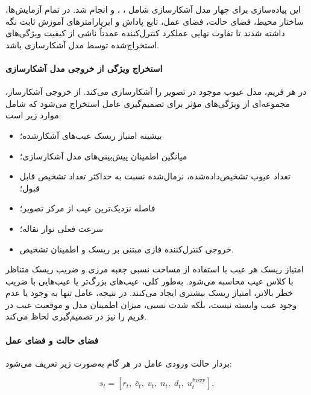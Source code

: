 \documentclass[a4paper, 10pt, twocolumn]{article}
\begin{document}
	این پیاده‌سازی برای چهار مدل آشکارسازی شامل ، ،  و  انجام شد. در تمام آزمایش‌ها، ساختار محیط، فضای حالت، فضای عمل، تابع پاداش و ابرپارامترهای آموزش  ثابت نگه داشته شدند تا تفاوت نهایی عملکرد کنترل‌کننده عمدتاً ناشی از کیفیت ویژگی‌های استخراج‌شده توسط مدل آشکارسازی باشد.
	
	\paragraph{استخراج ویژگی از خروجی مدل آشکارسازی}
	
	در هر فریم، مدل  عیوب موجود در تصویر را آشکارسازی می‌کند. از خروجی آشکارساز، مجموعه‌ای از ویژگی‌های مؤثر برای تصمیم‌گیری عامل استخراج می‌شود که شامل موارد زیر است:
	
	\begin{itemize}
		\item بیشینه امتیاز ریسک عیب‌های آشکارشده؛
		\item میانگین اطمینان پیش‌بینی‌های مدل آشکارسازی؛
		\item تعداد عیوب تشخیص‌داده‌شده، نرمال‌شده نسبت به حداکثر تعداد تشخیص قابل قبول؛
		\item فاصله نزدیک‌ترین عیب از مرکز تصویر؛
		\item سرعت فعلی نوار نقاله؛
		\item خروجی کنترل‌کننده فازی مبتنی بر ریسک و اطمینان تشخیص.
	\end{itemize}
	
	امتیاز ریسک هر عیب با استفاده از مساحت نسبی جعبه مرزی و ضریب ریسک متناظر با کلاس عیب محاسبه می‌شود. به‌طور کلی، عیب‌های بزرگ‌تر یا عیب‌هایی با ضریب خطر بالاتر، امتیاز ریسک بیشتری ایجاد می‌کنند. در نتیجه، عامل  تنها به وجود یا عدم وجود عیب وابسته نیست، بلکه شدت نسبی، میزان اطمینان مدل و موقعیت عیب در فریم را نیز در تصمیم‌گیری لحاظ می‌کند.
	
	\paragraph{فضای حالت و فضای عمل}
	
	بردار حالت ورودی عامل در هر گام به‌صورت زیر تعریف می‌شود:
	
	\begin{latin}
		\begin{equation}
			s_t =
			\left[
			r_t,\;
			\bar{c}_t,\;
			v_t,\;
			n_t,\;
			d_t,\;
			u^{\mathrm{fuzzy}}_t
			\right],
		\end{equation}
	\end{latin}
	
\end{document}
